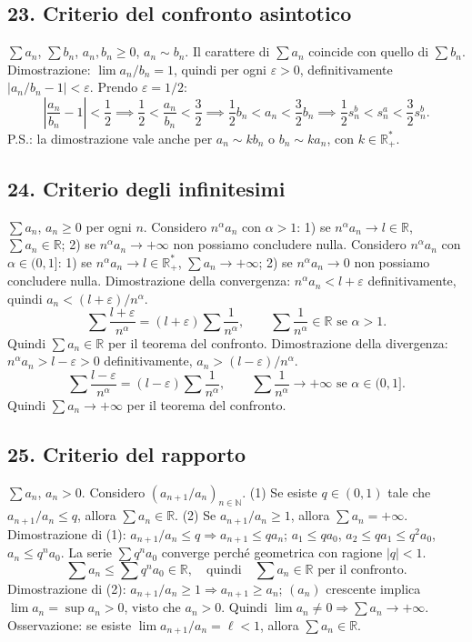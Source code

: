 \documentclass[11pt,a4paper]{article}
\newcommand{\R}{\mathbb R}\newcommand{\N}{\mathbb N}\newcommand{\pagina}[1]{\clearpage}
\begin{document}
\subsection*{23. Criterio del confronto asintotico}
$\sum a_n$, $\sum b_n$, $a_n,b_n\ge0$, $a_n\sim b_n$. Il carattere di $\sum a_n$ coincide con quello di $\sum b_n$.
Dimostrazione: $\lim a_n/b_n=1$, quindi per ogni $\varepsilon>0$, definitivamente $|a_n/b_n-1|<\varepsilon$. Prendo $\varepsilon=1/2$:
\[\left|\frac{a_n}{b_n}-1\right|<\frac12\implies\frac12<\frac{a_n}{b_n}<\frac32\implies\frac12b_n<a_n<\frac32b_n\implies\frac12s_n^b<s_n^a<\frac32s_n^b.\]
P.S.: la dimostrazione vale anche per $a_n\sim kb_n$ o $b_n\sim ka_n$, con $k\in\R_+^*$.
\pagina{58}
\subsection*{24. Criterio degli infinitesimi}
$\sum a_n$, $a_n\ge0$ per ogni $n$. Considero $n^\alpha a_n$ con $\alpha>1$: 1) se $n^\alpha a_n\to l\in\R$, $\sum a_n\in\R$; 2) se $n^\alpha a_n\to+\infty$ non possiamo concludere nulla.
Considero $n^\alpha a_n$ con $\alpha\in(0,1]$: 1) se $n^\alpha a_n\to l\in\R_+^*$, $\sum a_n\to+\infty$; 2) se $n^\alpha a_n\to0$ non possiamo concludere nulla.
Dimostrazione della convergenza: $n^\alpha a_n<l+\varepsilon$ definitivamente, quindi $a_n<(l+\varepsilon)/n^\alpha$.
\[\sum\frac{l+\varepsilon}{n^\alpha}=(l+\varepsilon)\sum\frac1{n^\alpha},\qquad\sum\frac1{n^\alpha}\in\R\text{ se }\alpha>1.\]
Quindi $\sum a_n\in\R$ per il teorema del confronto.
Dimostrazione della divergenza: $n^\alpha a_n>l-\varepsilon>0$ definitivamente, $a_n>(l-\varepsilon)/n^\alpha$.
\[\sum\frac{l-\varepsilon}{n^\alpha}=(l-\varepsilon)\sum\frac1{n^\alpha},\qquad\sum\frac1{n^\alpha}\to+\infty\text{ se }\alpha\in(0,1].\]
Quindi $\sum a_n\to+\infty$ per il teorema del confronto.
\pagina{59}
\subsection*{25. Criterio del rapporto}
$\sum a_n$, $a_n>0$. Considero $(a_{n+1}/a_n)_{n\in\N}$.
(1) Se esiste $q\in(0,1)$ tale che $a_{n+1}/a_n\le q$, allora $\sum a_n\in\R$.
(2) Se $a_{n+1}/a_n\ge1$, allora $\sum a_n=+\infty$.
Dimostrazione di (1): $a_{n+1}/a_n\le q\Rightarrow a_{n+1}\le qa_n$; $a_1\le qa_0$, $a_2\le qa_1\le q^2a_0$, $a_n\le q^na_0$. La serie $\sum q^na_0$ converge perché geometrica con ragione $|q|<1$.
\[\sum a_n\le\sum q^na_0\in\R,\quad\text{quindi}\quad\sum a_n\in\R\text{ per il confronto}.\]
Dimostrazione di (2): $a_{n+1}/a_n\ge1\Rightarrow a_{n+1}\ge a_n$; $(a_n)$ crescente implica $\lim a_n=\sup a_n>0$, visto che $a_n>0$. Quindi $\lim a_n\ne0\Rightarrow\sum a_n\to+\infty$.
Osservazione: se esiste $\lim a_{n+1}/a_n=\ell<1$, allora $\sum a_n\in\R$.
\pagina{60}
\end{document}
